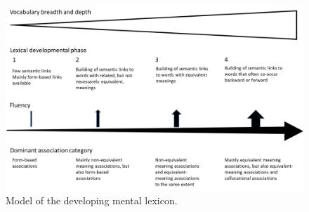 \documentclass[output=paper,colorlinks,citecolor=brown,nonflat]{langsci/langscibook}
\begin{document}
\begin{figure}
    \includegraphics[width=\textwidth]{figures/Gudmundson-fig5.pdf}
    \caption{Model of the developing mental lexicon.}
    \label{fig:gudmundson:5}
\end{figure}
\end{document}
